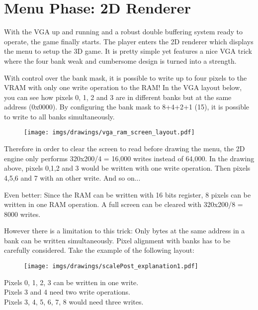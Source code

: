 \section{Menu Phase: 2D Renderer}
With the VGA up and running and a robust double buffering system ready to operate, the game finally starts. The player enters the 2D renderer which displays the menu to setup the 3D game. It is pretty simple yet features a nice VGA trick where the four bank weak and cumbersome design is turned into a strength.
\par
\begin{figure}[H]
\centering
{}
\end{figure}
\par

With control over the bank mask, it is possible to write up to four pixels to the VRAM with only one write operation to the RAM! In the VGA layout below, you can see how pixels 0, 1, 2 and 3 are in different banks but at the same address (0x0000). By configuring the bank mask to 8+4+2+1 (15), it is possible to write to all banks simultaneously.\\
\par
\begin{figure}[H]
\centering
\texttt{[image: imgs/drawings/vga\_ram\_screen\_layout.pdf]}
\end{figure}

\par
Therefore in order to clear the screen to read before drawing the menu, the 2D engine only performs 320x200/4 = 16,000 writes instead of 64,000. In the drawing above, pixels 0,1,2 and 3 would be written with one write operation. Then pixels 4,5,6 and 7 with an other write. And so on...\\
\par
Even better: Since the RAM can be written with 16 bits register, 8 pixels can be written in one RAM operation. A full screen can be cleared with 320x200/8 = 8000 writes.
\par
\begin{minipage}{\textwidth}

\end{minipage}
However there is a limitation to this trick: Only bytes at the same address in a bank can be written simultaneously. Pixel alignment with banks has to be carefully considered. Take the example of the following layout:\\
\par
\begin{figure}[H]
\centering
 \texttt{[image: imgs/drawings/scalePost\_explanation1.pdf]}
 \end{figure}
Pixels 0, 1, 2, 3 can be written in one write.\\
Pixels 3 and 4 need two write operations.\\
Pixels 3, 4, 5, 6, 7, 8 would need three writes.\\


